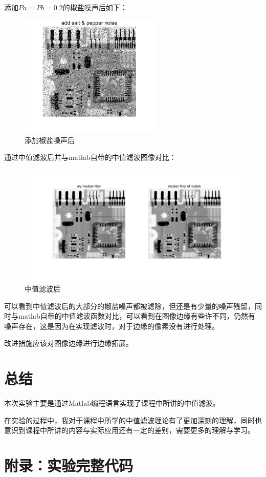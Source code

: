\documentclass{../source/Experiment}
\begin{document}
添加$Pa = Pb = 0.2$的椒盐噪声后如下：

\begin{figure}[H]
    \centering
    \includegraphics[width = 0.6\textwidth]{第二次/f2.png}
    \caption{添加椒盐噪声后}
\end{figure}

通过中值滤波后并与matlab自带的中值滤波图像对比：
\begin{figure}[H]
    \centering
    \includegraphics[width = 1\textwidth]{第二次/f3.png}
    \caption{中值滤波后}
\end{figure}
可以看到中值滤波后的大部分的椒盐噪声都被滤除，但还是有少量的噪声残留，同时与matlab自带的中值滤波函数对比，可以看到在图像边缘有些许不同，仍然有噪声存在，这是因为在实现滤波时，对于边缘的像素没有进行处理。

改进措施应该对图像边缘进行边缘拓展。
\section{总结}
本次实验主要是通过Matlab编程语言实现了课程中所讲的中值滤波。

在实验的过程中，我对于课程中所学的中值滤波理论有了更加深刻的理解，同时也意识到课程中所讲的内容与实际应用还有一定的差别，需要更多的理解与学习。

\section{附录：实验完整代码}


\end{document}
